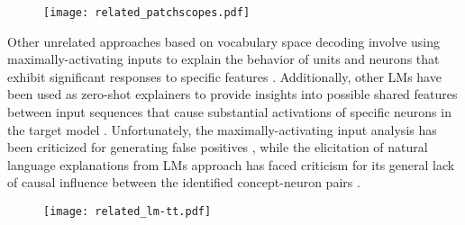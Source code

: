 \begin{figure}[H]
    \centering
    \texttt{[image: related\_patchscopes.pdf]}
    \caption{}
    \label{fig:related_patchscopes}
\end{figure}


Other unrelated approaches based on vocabulary space decoding involve using maximally-activating inputs to explain the behavior of units and neurons that exhibit significant responses to specific features \cite{dalvi2019}.
Additionally, other LMs have been used as zero-shot explainers to provide insights into possible shared features between input sequences that cause substantial activations of specific neurons in the target model \cite{bills2023}.
Unfortunately, the maximally-activating input analysis has been criticized for generating false positives \cite{bolukbasi2021}, while the elicitation of natural language explanations from LMs approach has faced criticism for its general lack of causal influence between the identified concept-neuron pairs \cite{huang2023}.


\begin{figure}[H]
    \centering
    \texttt{[image: related\_lm-tt.pdf]}
    \caption{}
    \label{fig:related_lm-tt}
\end{figure}